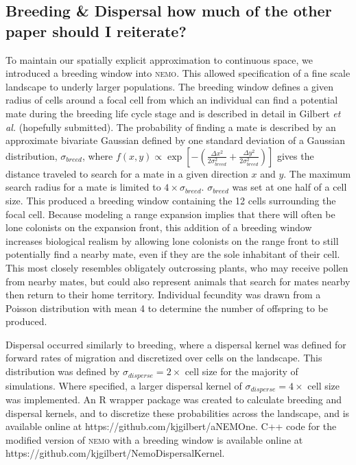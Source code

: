 \subsection{Breeding \& Dispersal \color{red} \footnotesize how much of the other paper should I reiterate? \normalsize \color{black}}
To maintain our spatially explicit approximation to continuous space, we introduced a breeding window into \textsc{nemo}. This allowed specification of a fine scale landscape to underly larger populations. The breeding window defines a given radius of cells around a focal cell from which an individual can find a potential mate during the breeding life cycle stage and is described in detail in Gilbert \emph{et al.} (hopefully submitted). 
The probability of finding a mate is described by an approximate bivariate Gaussian defined by one standard deviation of a Gaussian distribution, $\sigma_{breed}$, where $f(x,y) \propto \exp{[-(\frac{\Delta x^2}{2\sigma_{breed}^2}+\frac{\Delta y^2}{2\sigma_{breed}^2})]}$ gives the distance traveled to search for a mate in a given direction $x$ and $y$. The maximum search radius for a mate is limited to $4\times\sigma_{breed}$. $\sigma_{breed}$ was set at one half of a cell size. This produced a breeding window containing the 12 cells surrounding the focal cell. Because modeling a range expansion implies that there will often be lone colonists on the expansion front, this addition of a breeding window increases biological realism by allowing lone colonists on the range front to still potentially find a nearby mate, even if they are the sole inhabitant of their cell. This most closely resembles obligately outcrossing plants, who may receive pollen from nearby mates, but could also represent animals that search for mates nearby then return to their home territory. Individual fecundity was drawn from a Poisson distribution with mean 4 to determine the number of offspring to be produced.

Dispersal occurred similarly to breeding, where a dispersal kernel was defined for forward rates of migration and discretized over cells on the landscape. This distribution was defined by $\sigma_{disperse} = 2\times$ cell size for the majority of simulations. Where specified, a larger dispersal kernel of $\sigma_{disperse} = 4\times$ cell size was implemented. An R wrapper package was created to calculate breeding and dispersal kernels, and to discretize these probabilities across the landscape, and is available online at https://github.com/kjgilbert/aNEMOne. C++ code for the modified version of \textsc{nemo} with a breeding window is available online at https://github.com/kjgilbert/NemoDispersalKernel.
 
